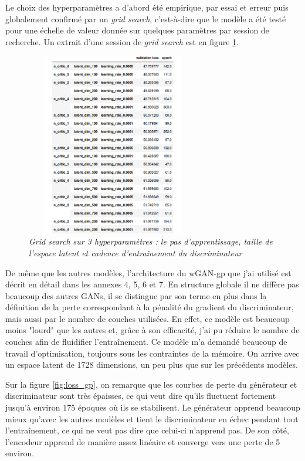 \documentclass[12pt, oneside, a4paper, titlepage]{article}
\begin{document}
Le choix des hyperparamètres a d'abord été empirique, par essai et erreur puis globalement confirmé par un \textit{grid search}, c'est-à-dire que le modèle a été testé pour une échelle de valeur donnée sur quelques paramètres par session de recherche. Un extrait d'une session de \textit{grid search }est en figure \ref{fig:grid}.

\begin{figure}[H]
    \centering
\includegraphics[width=7.5cm, height=8cm]{grid.png}
    \caption{\textit{Grid search sur 3 hyperparamètres : le pas d'apprentissage, taille de l'espace latent et cadence d'entraînement du discriminateur}}
    \label{fig:grid}
\end{figure}

De même que les autres modèles, l'architecture du wGAN-gp que j'ai utilisé est décrit en détail dans les annexes 4, 5, 6 et 7. En structure globale il ne diffère pas beaucoup des autres GANs, il se distingue par son terme en plus dans la définition de la perte correspondant à la pénalité du gradient du discriminateur, mais aussi par le nombre de couches utilisées. En effet, ce modèle est beaucoup moins "lourd" que les autres et, grâce à son efficacité, j'ai pu réduire le nombre de couches afin de fluidifier l'entraînement. Ce modèle m'a demandé beaucoup de travail d'optimisation, toujours sous les contraintes de la mémoire. On arrive avec un espace latent de 1728 dimensions, un peu plus que sur les précédents modèles. 

Sur la figure \ref{fig:loss_gp}, on remarque que les courbes de perte du générateur et discriminateur sont très épaisses, ce qui veut dire qu'ils fluctuent fortement jusqu'à environ 175 époques où ils se stabilisent. Le générateur apprend beaucoup mieux qu'avec les autres modèles et tient le discriminateur en échec pendant tout l'entraînement, ce qui ne veut pas dire que celui-ci n'apprend pas. De son côté, l'encodeur apprend de manière assez linéaire et converge vers une perte de 5 environ.
\end{document}
